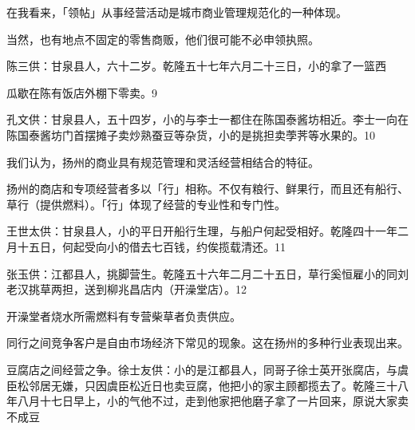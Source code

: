 在我看来，「领帖」从事经营活动是城市商业管理规范化的一种体现。

当然，也有地点不固定的零售商贩，他们很可能不必申领执照。

\begin{BookQuote}
陈三供：甘泉县人，六十二岁。乾隆五十七年六月二十三日，小的拿了一篮西
\end{BookQuote}

\vfill
\begin{BookNotes}
\end{BookNotes}

\noindent 瓜歇在陈有饭店外棚下零卖。9

孔文供：甘泉县人，五十四岁，小的与李士一都住在陈国泰酱坊相近。李士一向在陈国泰酱坊门首摆摊子卖炒熟蚕豆等杂货，小的是挑担卖荸荠等水果的。10

我们认为，扬州的商业具有规范管理和灵活经营相结合的特征。


\noindent 扬州的商店和专项经营者多以「行」相称。不仅有粮行、鲜果行，而且还有船行、草行（提供燃料）。「行」体现了经营的专业性和专门性。

王世太供：甘泉县人，小的平日开船行生理，与船户何起受相好。乾隆四十一年二月十五日，何起受向小的借去七百钱，约俟揽载清还。11

张玉供：江都县人，挑脚营生。乾隆五十六年二月二十五日，草行奚恒雇小的同刘老汉挑草两担，送到柳兆昌店内（开澡堂店）。12

开澡堂者烧水所需燃料有专营柴草者负责供应。


\noindent 同行之间竞争客户是自由市场经济下常见的现象。这在扬州的多种行业表现出来。

豆腐店之间经营之争。徐士友供：小的是江都县人，同哥子徐士英开张腐店，与虞臣松邻居无嫌，只因虞臣松近日也卖豆腐，他把小的家主顾都揽去了。乾隆三十八年八月十七日早上，小的气他不过，走到他家把他磨子拿了一片回来，原说大家卖不成豆

\vfill
\begin{BookNotes}
\end{BookNotes}

